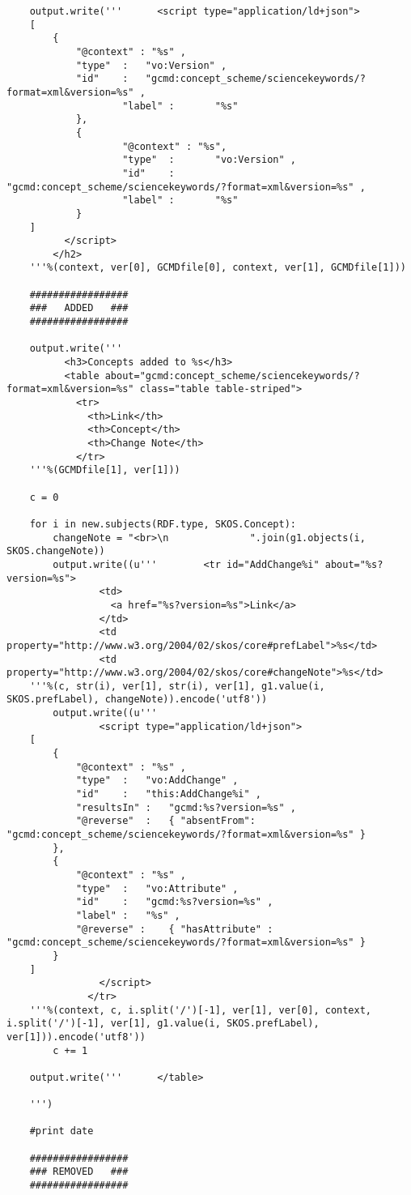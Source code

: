 \begin{verbatim}
	output.write('''      <script type="application/ld+json">
	[
		{
			"@context" : "%s" ,
			"type"	:	"vo:Version" ,
			"id"	:	"gcmd:concept_scheme/sciencekeywords/?format=xml&version=%s" ,
	                "label" :       "%s"
	        },
	        {
	                "@context" : "%s",
	                "type"  :       "vo:Version" ,
	                "id"    :       "gcmd:concept_scheme/sciencekeywords/?format=xml&version=%s" ,
	                "label" :       "%s"
	        }
	]
	      </script>
	    </h2>
	'''%(context, ver[0], GCMDfile[0], context, ver[1], GCMDfile[1]))
	
	#################
	###   ADDED   ###
	#################
	
	output.write('''
	      <h3>Concepts added to %s</h3>
	      <table about="gcmd:concept_scheme/sciencekeywords/?format=xml&version=%s" class="table table-striped">
	        <tr>
	          <th>Link</th>
	          <th>Concept</th>
	          <th>Change Note</th>
	        </tr>
	'''%(GCMDfile[1], ver[1]))
	
	c = 0
	
	for i in new.subjects(RDF.type, SKOS.Concept):
		changeNote = "<br>\n              ".join(g1.objects(i, SKOS.changeNote))
		output.write((u'''        <tr id="AddChange%i" about="%s?version=%s">
	            <td>
	              <a href="%s?version=%s">Link</a>
	            </td>
	            <td property="http://www.w3.org/2004/02/skos/core#prefLabel">%s</td>
	            <td property="http://www.w3.org/2004/02/skos/core#changeNote">%s</td>
	'''%(c, str(i), ver[1], str(i), ver[1], g1.value(i, SKOS.prefLabel), changeNote)).encode('utf8'))
		output.write((u'''
	            <script type="application/ld+json">
	[
		{
			"@context" : "%s" ,
			"type"	:	"vo:AddChange" ,
			"id"	:	"this:AddChange%i" ,
			"resultsIn" :	"gcmd:%s?version=%s" ,
			"@reverse"  :	{ "absentFrom": "gcmd:concept_scheme/sciencekeywords/?format=xml&version=%s" }
		},
		{
			"@context" : "%s" ,
			"type"	:	"vo:Attribute" ,
			"id"	:	"gcmd:%s?version=%s" ,
			"label" :	"%s" ,
			"@reverse" :	{ "hasAttribute" : "gcmd:concept_scheme/sciencekeywords/?format=xml&version=%s" }
		}
	]
	            </script>
	          </tr>
	'''%(context, c, i.split('/')[-1], ver[1], ver[0], context, i.split('/')[-1], ver[1], g1.value(i, SKOS.prefLabel), ver[1])).encode('utf8'))
		c += 1
	
	output.write('''      </table>
	
	''')
	
	#print date
	
	#################
	### REMOVED   ###
	#################
	

\end{verbatim}
